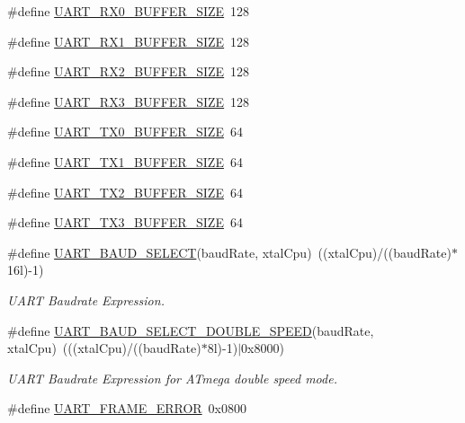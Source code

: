 \begin{DoxyCompactItemize}
\item 
\#define \hyperlink{group__avr-uart_gab8bc9ef5bc3b98f92244ad33e3aa710b}{U\-A\-R\-T\-\_\-\-R\-X0\-\_\-\-B\-U\-F\-F\-E\-R\-\_\-\-S\-I\-Z\-E}~128
\item 
\#define \hyperlink{group__avr-uart_ga307d6198ba9f74705f0bc3736709fe36}{U\-A\-R\-T\-\_\-\-R\-X1\-\_\-\-B\-U\-F\-F\-E\-R\-\_\-\-S\-I\-Z\-E}~128
\item 
\#define \hyperlink{group__avr-uart_gac347da2ed3e6b23898e44fe64b86eee1}{U\-A\-R\-T\-\_\-\-R\-X2\-\_\-\-B\-U\-F\-F\-E\-R\-\_\-\-S\-I\-Z\-E}~128
\item 
\#define \hyperlink{group__avr-uart_ga3d155a1b4d19d75f2fda8f1929a894f6}{U\-A\-R\-T\-\_\-\-R\-X3\-\_\-\-B\-U\-F\-F\-E\-R\-\_\-\-S\-I\-Z\-E}~128
\item 
\#define \hyperlink{group__avr-uart_gaa4710900760f3d4aed60b8df217816af}{U\-A\-R\-T\-\_\-\-T\-X0\-\_\-\-B\-U\-F\-F\-E\-R\-\_\-\-S\-I\-Z\-E}~64
\item 
\#define \hyperlink{group__avr-uart_ga80ce1ddda71df76f574b75925eaedfe4}{U\-A\-R\-T\-\_\-\-T\-X1\-\_\-\-B\-U\-F\-F\-E\-R\-\_\-\-S\-I\-Z\-E}~64
\item 
\#define \hyperlink{group__avr-uart_ga634374ee99b523fc1020c230e314d5c8}{U\-A\-R\-T\-\_\-\-T\-X2\-\_\-\-B\-U\-F\-F\-E\-R\-\_\-\-S\-I\-Z\-E}~64
\item 
\#define \hyperlink{group__avr-uart_ga059b928e111f60d48c47e256f1717c7f}{U\-A\-R\-T\-\_\-\-T\-X3\-\_\-\-B\-U\-F\-F\-E\-R\-\_\-\-S\-I\-Z\-E}~64
\item 
\#define \hyperlink{group__avr-uart_ga367ff7b5de225ed936a63239ad4adb0b}{U\-A\-R\-T\-\_\-\-B\-A\-U\-D\-\_\-\-S\-E\-L\-E\-C\-T}(baud\-Rate, xtal\-Cpu)~((xtal\-Cpu)/((baud\-Rate)$\ast$16l)-\/1)
\begin{DoxyCompactList}\small\item\em U\-A\-R\-T Baudrate Expression. \end{DoxyCompactList}\item 
\#define \hyperlink{group__avr-uart_ga1a02d45130520cb651ab313e69039382}{U\-A\-R\-T\-\_\-\-B\-A\-U\-D\-\_\-\-S\-E\-L\-E\-C\-T\-\_\-\-D\-O\-U\-B\-L\-E\-\_\-\-S\-P\-E\-E\-D}(baud\-Rate, xtal\-Cpu)~(((xtal\-Cpu)/((baud\-Rate)$\ast$8l)-\/1)$|$0x8000)
\begin{DoxyCompactList}\small\item\em U\-A\-R\-T Baudrate Expression for A\-Tmega double speed mode. \end{DoxyCompactList}\item 
\#define \hyperlink{group__avr-uart_gabcdb1041d763560cd8f8e722370dfd37}{U\-A\-R\-T\-\_\-\-F\-R\-A\-M\-E\-\_\-\-E\-R\-R\-O\-R}~0x0800

\end{DoxyCompactItemize}

